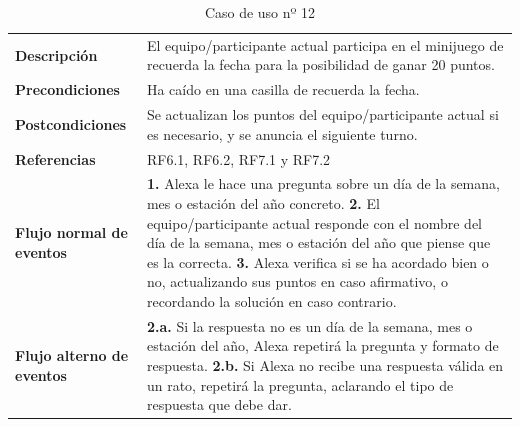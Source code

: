 \begin{table}[H]
	\centering
	\begin{tabular}{|p{3cm}|p{12cm}|}
		\hline
		\rowcolor{lightgray}
		\multicolumn{2}{|c|}{\textbf{CU12}: Minijuego recuerda la fecha} \\
		\hline
		\textbf{Descripción} & El equipo/participante actual participa en el minijuego de recuerda la fecha para la posibilidad de ganar 20 puntos. \vspace{0.2cm} \\
		\hline
		\textbf{Precondiciones} & Ha caído en una casilla de recuerda la fecha. \vspace{0.2cm} \\
		\hline
		\textbf{Postcondiciones} & Se actualizan los puntos del equipo/participante actual si es necesario, y se anuncia el siguiente turno. \vspace{0.2cm} \\
		\hline
		\textbf{Referencias} & RF6.1, RF6.2, RF7.1 y RF7.2 \vspace{0.2cm} \\
		\hline
		\textbf{Flujo normal de eventos} &
		\textbf{1.} Alexa le hace una pregunta sobre un día de la semana, mes o estación del año concreto. \newline
		\vspace{0.2cm}
		\textbf{2.} El equipo/participante actual responde con el nombre del día de la semana, mes o estación del año que piense que es la correcta. \newline
		\vspace{0.2cm}
		\textbf{3.} Alexa verifica si se ha acordado bien o no, actualizando sus puntos en caso afirmativo, o recordando la solución en caso contrario.
		\vspace{0.1cm} \\
		\hline
		\textbf{Flujo alterno de eventos} &
		\textbf{2.a.} Si la respuesta no es un día de la semana, mes o estación del año, Alexa repetirá la pregunta y formato de respuesta. \newline
		\vspace{0.2cm} 
		\textbf{2.b.} Si Alexa no recibe una respuesta válida en un rato, repetirá la pregunta, aclarando el tipo de respuesta que debe dar.
		\vspace{0.2cm} \\
		\hline
	\end{tabular}
	\caption{Caso de uso nº 12}
	\label{tab:CU12}
\end{table}

